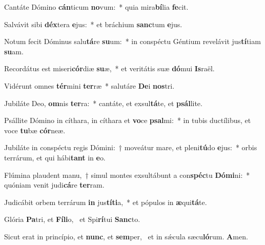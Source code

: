 \item Cantáte Dómino \textbf{cán}ticum \textbf{no}vum:~* quia mira\textbf{bí}lia \textbf{fe}cit.
\item Salvávit sibi \textbf{déx}tera \textbf{e}jus:~* et bráchium \textbf{sanc}tum \textbf{e}jus.
\item Notum fecit Dóminus salu\textbf{tá}re \textbf{su}um:~* in conspéctu Géntium revelávit jus\textbf{tí}tiam \textbf{su}am.
\item Recordátus est miseri\textbf{cór}diæ \textbf{su}æ,~* et veritátis suæ \textbf{dó}mui \textbf{Is}raël.
\item Vidérunt omnes \textbf{tér}mini \textbf{ter}ræ~* salutáre \textbf{De}i \textbf{nos}tri.
\item Jubiláte Deo, \textbf{om}nis \textbf{ter}ra:~* cantáte, et exsul\textbf{tá}te, et \textbf{psál}lite.
\item Psállite Dómino in cíthara, in cíthara et \textbf{vo}ce \textbf{psal}mi:~* in tubis ductílibus, et voce \textbf{tu}bæ \textbf{cór}neæ.
\item Jubiláte in conspéctu regis Dómini:~† moveátur mare, et pleni\textbf{tú}do \textbf{e}jus:~* orbis terrárum, et qui hábi\textbf{tant} in \textbf{e}o.
\item Flúmina plaudent manu,~† simul montes exsultábunt a con\textbf{spéc}tu \textbf{Dó}\textbf{mi}ni:~* quóniam venit judi\textbf{cá}re \textbf{ter}ram.
\item Judicábit orbem terrárum \textbf{in} jus\textbf{tí}\textbf{ti}a,~* et pópulos in \textbf{æ}qui\textbf{tá}te.
\item Glória \textbf{Pa}tri, et \textbf{Fí}\textbf{li}o,~\psstar{} et Spi\textbf{rí}tui \textbf{Sanc}to.
\item Sicut erat in princípio, et \textbf{nunc}, et \textbf{sem}per,~\psstar{} et in sǽcula sæcu\textbf{ló}rum. \textbf{A}men.